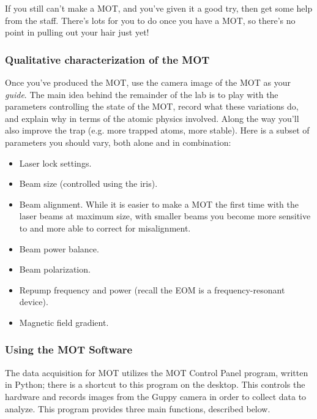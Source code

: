\documentclass{../lab}
\begin{document}
If you still can't make a MOT, and you've given it a good try, then get some help from the staff. There's lots for you to do once you have a MOT, so there's no point in pulling out your hair just yet!

\subsubsection{Qualitative characterization of the MOT}

Once you've produced the MOT, use the camera image of the MOT as your \emph{guide}. The main idea behind the remainder of the lab is to play with the parameters controlling the state of the MOT, record what these variations do, and explain why in terms of the atomic physics involved. Along the way you'll also improve the trap (e.g. more trapped atoms, more stable). Here is a subset of parameters you should vary, both alone and in combination:

\begin{itemize}
    \item Laser lock settings.

    \item Beam size (controlled using the iris).

    \item Beam alignment. While it is easier to make a MOT the first time with the laser beams at maximum size, with smaller beams you become more sensitive to and more able to correct for misalignment.

    \item Beam power balance.

    \item Beam polarization.

    \item Repump frequency and power (recall the EOM is a frequency-resonant device).

    \item Magnetic field gradient.
\end{itemize}


\subsubsection{Using the MOT Software}

The data acquisition for MOT utilizes the MOT Control Panel program, written in Python; there is a shortcut to this program on the desktop. This controls the hardware and records images from the Guppy camera in order to collect data to analyze. This program provides three main functions, described below. %
\end{document}
